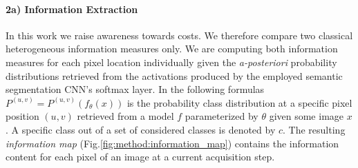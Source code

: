 \documentclass{bmvc2k}
\begin{document}
\vspace{-0.275cm}\paragraph{2a) Information Extraction}\label{method:acquisition_functions}
In this work we raise awareness towards costs. We therefore compare two classical heterogeneous information measures only. We are computing both information measures for each pixel location individually given the {\it a-posteriori} probability distributions retrieved from the activations produced by the employed semantic segmentation CNN's softmax layer. In the following formulas $P^{(u,v)} \widehat{=} P^{(u,v)}(f_{\theta}(x))$ is the probability class distribution at a specific pixel position $(u,v)$ retrieved from a model $f$ parameterized by $\theta$ given some image $x$. A specific class out of a set of considered classes is denoted by $c$. The resulting {\it information map} (Fig.\ref{fig:method:information_map}) contains the information content for each pixel of an image at a current acquisition step.  
\end{document}
